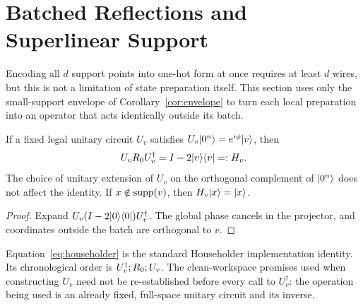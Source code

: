\section{Batched Reflections and Superlinear Support}\label{sec:lifting}
Encoding all $d$ support points into one-hot form at once requires at least $d$ wires, but this is not a limitation of state preparation itself. This section uses only the small-support envelope of Corollary~\ref{cor:envelope} to turn each local preparation into an operator that acts identically outside its batch.

\begin{lemma}\label{lem:householder}
If a fixed legal unitary circuit $U_v$ satisfies $U_v\lvert 0^n\rangle=e^{i\phi}\lvert v\rangle$, then
\begin{equation}\label{eq:householder}
U_vR_0 U_v^\dagger=I-2\lvert v\rangle\langle v\rvert=:H_v.
\end{equation}
The choice of unitary extension of $U_v$ on the orthogonal complement of $\lvert 0^n\rangle$ does not affect the identity. If $x\notin\operatorname{supp}(v)$, then $H_v\lvert x\rangle=\lvert x\rangle$.
\end{lemma}
\begin{proof}
Expand $U_v(I-2\lvert 0\rangle\langle 0\rvert)U_v^\dagger$. The global phase cancels in the projector, and coordinates outside the batch are orthogonal to $v$.
\end{proof}
Equation~\eqref{eq:householder} is the standard Householder implementation identity\cite{malvetti2021}. Its chronological order is $U_v^\dagger;R_0;U_v$. The clean-workspace promises used when constructing $U_v$ need not be re-established before every call to $U_v^\dagger$: the operation being used is an already fixed, full-space unitary circuit and its inverse.

